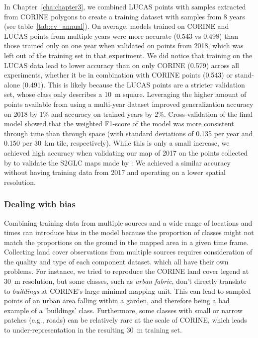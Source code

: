         In Chapter~\ref{cha:chapter3}, we combined LUCAS points with samples extracted from CORINE polygons to create a training dataset with samples from 8 years (see table~\ref{tab:cv_annual}). On average, models trained on CORINE and LUCAS points from multiple years were more accurate (0.543 vs 0.498) than those trained only on one year when validated on points from 2018, which was left out of the training set in that experiment. We did notice that training on the LUCAS data lead to lower accuracy than on only CORINE (0.579) across all experiments, whether it be in combination with CORINE points (0.543) or stand-alone (0.491). This is likely because the LUCAS points are a stricter validation set, whose class only describes a 10~m square. Leveraging the higher amount of points available from using a multi-year dataset improved generalization accuracy on 2018 by 1\% and accuracy on trained years by 2\%. Cross-validation of the final model showed that the weighted F1-score of the model was more consistent through time than through space (with standard deviations of 0.135 per year and 0.150 per 30~km tile, respectively). While this is only a small increase, we achieved high accuracy when validating our map of 2017 on the points collected by \citet{jenerowicz2021validation} to validate the S2GLC maps made by \citet{malinowski2020automated}: We achieved a similar accuracy without having training data from 2017 and operating on a lower spatial resolution.

        \subsubsection{Dealing with bias}
        
        Combining training data from multiple sources and a wide range of locations and times can introduce bias in the model because the proportion of classes might not match the proportions on the ground in the mapped area in a given time frame. Collecting land cover observations from multiple sources requires consideration of the quality and type of each component dataset. which all have their own problems. For instance, we tried to reproduce the CORINE land cover legend at 30~m resolution, but some classes, such as \textit{urban fabric}, don't directly translate to \textit{buildings} at CORINE's large minimal mapping unit. This can lead to sampled points of an urban area falling within a garden, and therefore being a bad example of a 'buildings' class. Furthermore, some classes with small or narrow patches (e.g., roads) can be relatively rare at the scale of CORINE, which leads to under-representation in the resulting 30~m training set. 

